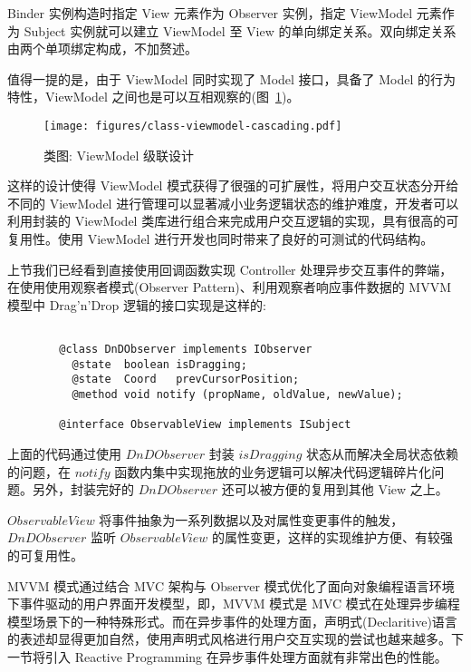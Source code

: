 Binder 实例构造时指定 View 元素作为 Observer 实例，指定 ViewModel 元素作为 Subject 实例就可以建立 ViewModel 至 View 的单向绑定关系。双向绑定关系由两个单项绑定构成，不加赘述。

值得一提的是，由于 ViewModel 同时实现了 Model 接口，具备了 Model 的行为特性，ViewModel 之间也是可以互相观察的(图~\ref{ViewModelCascading})。

\begin{figure}[!h]
  \begin{center}
    \texttt{[image: figures/class-viewmodel-cascading.pdf]}
    \caption{类图: ViewModel 级联设计\label{ViewModelCascading}}
  \end{center}
\end{figure}

这样的设计使得 ViewModel 模式获得了很强的可扩展性，将用户交互状态分开给不同的 ViewModel 进行管理可以显著减小业务逻辑状态的维护难度，开发者可以利用封装的 ViewModel 类库进行组合来完成用户交互逻辑的实现，具有很高的可复用性。使用 ViewModel 进行开发也同时带来了良好的可测试的代码结构。

上节我们已经看到直接使用回调函数实现 Controller 处理异步交互事件的弊端，在使用使用观察者模式(Observer Pattern)、利用观察者响应事件数据的 MVVM 模型中 Drag'n'Drop 逻辑的接口实现是这样的:

\begin{verbatim}

        @class DnDObserver implements IObserver
          @state  boolean isDragging;
          @state  Coord   prevCursorPosition;
          @method void notify (propName, oldValue, newValue);

        @interface ObservableView implements ISubject

\end{verbatim}

上面的代码通过使用 $DnDObserver$ 封装 $isDragging$ 状态从而解决全局状态依赖的问题，在 $notify$ 函数内集中实现拖放的业务逻辑可以解决代码逻辑碎片化问题。另外，封装完好的 $DnDObserver$ 还可以被方便的复用到其他 View 之上。

$ObservableView$ 将事件抽象为一系列数据以及对属性变更事件的触发，$DnDObserver$ 监听 $ObservableView$ 的属性变更，这样的实现维护方便、有较强的可复用性。

MVVM 模式通过结合 MVC 架构与 Observer 模式优化了面向对象编程语言环境下事件驱动的用户界面开发模型，即，MVVM 模式是 MVC 模式在处理异步编程模型场景下的一种特殊形式。而在异步事件的处理方面，声明式(Declaritive)语言的表述却显得更加自然，使用声明式风格进行用户交互实现的尝试也越来越多。下一节将引入 Reactive Programming 在异步事件处理方面就有非常出色的性能。

